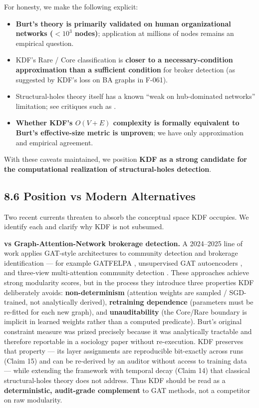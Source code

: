 For honesty, we make the following explicit:

\begin{itemize}
\tightlist
\item
  \textbf{Burt's theory is primarily validated on human organizational networks (\(< 10^3\) nodes)}; application at millions of nodes remains an empirical question.
\item
  KDF's Rare / Core classification is \textbf{closer to a necessary-condition approximation than a sufficient condition} for broker detection (as suggested by KDF's loss on BA graphs in F-061).
\item
  Structural-holes theory itself has a known ``weak on hub-dominated networks'' limitation; see critiques such as \citet{powell2005network}.
\item
  \textbf{Whether KDF's \(O(V + E)\) complexity is formally equivalent to Burt's effective-size metric is unproven}; we have only approximation and empirical agreement.
\end{itemize}

With these caveats maintained, we position \textbf{KDF as a strong candidate for the computational realization of structural-holes detection}.

\subsection{8.6 Position vs Modern Alternatives}\label{position-vs-modern-alternatives}

Two recent currents threaten to absorb the conceptual space KDF occupies. We identify each and clarify why KDF is not subsumed.

\textbf{vs Graph-Attention-Network brokerage detection.} A 2024--2025 line of work applies GAT-style architectures to community detection and brokerage identification --- for example GATFELPA \citep{gatfelpa2024}, unsupervised GAT autoencoders \citep{gat-autoencoder2025}, and three-view multi-attention community detection \citep{tkdd-3672081}. These approaches achieve strong modularity scores, but in the process they introduce three properties KDF deliberately avoids: \textbf{non-determinism} (attention weights are sampled / SGD-trained, not analytically derived), \textbf{retraining dependence} (parameters must be re-fitted for each new graph), and \textbf{unauditability} (the Core/Rare boundary is implicit in learned weights rather than a computed predicate). Burt's \citep{burt1992holes} original constraint measure was prized precisely because it was analytically tractable and therefore reportable in a sociology paper without re-execution. KDF preserves that property --- its layer assignments are reproducible bit-exactly across runs (Claim 15) and can be re-derived by an auditor without access to training data --- while extending the framework with temporal decay (Claim 14) that classical structural-holes theory does not address. Thus KDF should be read as a \textbf{deterministic, audit-grade complement} to GAT methods, not a competitor on raw modularity.

